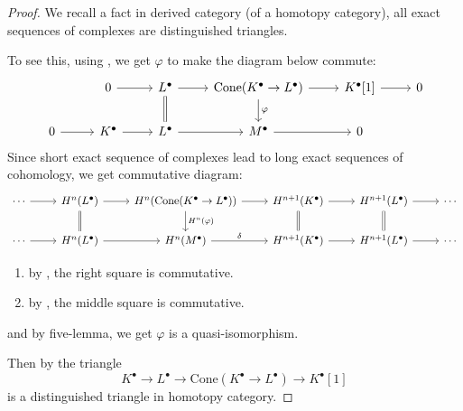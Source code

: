 \begin{proof}
    We recall a fact in derived category (of a homotopy category), all exact sequences of complexes are distinguished triangles.

    To see this, using \cite[\href{https://stacks.math.columbia.edu/tag/08RI}{Tag 08RI}]{stacks-project}, we get $\varphi$ to make the diagram below commute:
    \[
        \begin{tikzcd}
            \quad       & 0  \arrow[r]                   & L^\bullet \arrow[r] \arrow[d, equal] & \mathrm{Cone}(K^\bullet\to L^\bullet) \arrow[r] \arrow[d, "\varphi"] & K^\bullet[1] \arrow[r] & 0 \\
            0 \arrow[r] & K^\bullet \arrow[r]                  & L^\bullet \arrow[r]                  & M^\bullet \arrow[r]                                                      &  0
        \end{tikzcd}
    \]
    Since short exact sequence of complexes lead to long exact sequences of cohomology, we get commutative diagram:
    \[
        \begin{tikzcd}
            \cdots \arrow[r] & H^n(L^\bullet) \arrow[r] \arrow[d, equal] & H^n(\mathrm{Cone}(K^\bullet\to L^\bullet)) \arrow[r] \arrow[d, "H^n(\varphi)"] & H^{n+1}(K^\bullet) \arrow[r] \arrow[d, equal] & H^{n+1}(L^\bullet) \arrow[r] \arrow[d, equal] & \cdots \\
            \cdots \arrow[r] & H^n(L^\bullet) \arrow[r]                  & H^n(M^\bullet) \arrow[r, "\delta"]                                             & H^{n+1}(K^\bullet) \arrow[r]                  & H^{n+1}(L^\bullet) \arrow[r]                  & \cdots
        \end{tikzcd}
    \]
    \begin{enumerate}
        \item  by \cite[Lemma~1.5.3]{Weibel1994HA}, the right square is commutative.
        \item  by \cite[Exercise.~1.5.6]{Weibel1994HA}, the middle square is commutative.
    \end{enumerate}
    and by five-lemma, we get $\varphi$ is a quasi-isomorphism.

    Then by \cite[\href{https://stacks.math.columbia.edu/tag/014L}{Tag 014L} and \href{https://stacks.math.columbia.edu/tag/014Q}{Tag 014Q}]{stacks-project} the triangle
    \[
        K^\bullet \to L^\bullet \to \mathrm{Cone}(K^\bullet\to L^\bullet) \to K^\bullet[1]
    \]
    is a distinguished triangle in homotopy category.


\end{proof}

